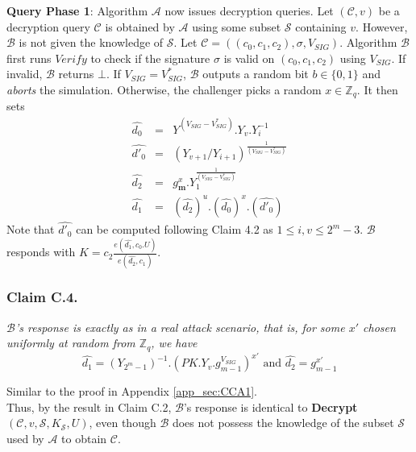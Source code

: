 \noindent\textbf{Query Phase 1}: Algorithm $\mathcal{A}$ now issues decryption queries. Let $(\mathcal{C},v)$ be a decryption query $\mathcal{C}$ is obtained by $\mathcal{A}$ using some subset $\mathcal{S}$ containing $v$. However, $\mathcal{B}$ is not given the knowledge of $\mathcal{S}$. Let $\mathcal{C}=((c_0,c_1,c_2),\sigma,V_{SIG})$. Algorithm $\mathcal{B}$ first runs $Verify$ to check if the signature $\sigma$ is valid on $(c_0,c_1,c_2)$ using $V_{SIG}$. If invalid, $\mathcal{B}$ returns $\bot$. If $V_{SIG} = V^{*}_{SIG}$, $\mathcal{B}$ outputs a random bit $b\in\{0,1\}$ and \emph{aborts} the simulation. Otherwise, the challenger picks a random $x\in\mathbb{Z}_q$. It then sets
\begin{eqnarray}
 \hat{d_0}&=&Y^{(V_{SIG}-V^{*}_{SIG})}.Y_v.Y^{-1}_i\nonumber\\
 \hat{d'_0}&=&(Y_{v+1}/Y_{i+1})^{\frac{1}{(V_{SIG}-V^{*}_{SIG})}}\nonumber \\
 \hat{d_2}&=&g^{x}_{\mathbf{m}}.Y^{\frac{1}{(V_{SIG}-V^{*}_{SIG})}}_1\nonumber\\
 \hat{d_1}&=&\left(\hat{d_2}\right)^u.\left(\hat{d_0}\right)^x.\left(\hat{d'_0}\right) \nonumber 
\end{eqnarray}
\noindent Note that $\hat{d'_0}$ can be computed following Claim 4.2 as $1\leq i,v \leq 2^m-3$. $\mathcal{B}$ responds with $K=c_2\frac{{e}(\hat{d_1},c_0.U)}{{e}(\hat{d_2},c_1)}$. 

\subsubsection{Claim C.4.} \textit{$\mathcal{B}$'s response is exactly as in a real attack scenario, that is, for some $x'$ chosen uniformly at random from $\mathbb{Z}_q$, we have} 
\begin{equation}
\hat{d_1} = \left({Y_{2^m-1}}\right)^{-1}.\left(PK.Y_v.g^{V_{SIG}}_{m-1}\right)^{x'}  \text{ and }  \hat{d_2} = g^{x'}_{m-1}\nonumber
\end{equation}

 Similar to the proof in Appendix \ref{app_sec:CCA1}.\\

% 
% 

\noindent Thus, by the result in Claim C.2, $\mathcal{B}$'s response is identical to \textbf{Decrypt}$(\mathcal{C},v,\mathcal{S},K_{\mathcal{S}},U)$, even though $\mathcal{B}$ does not possess the knowledge of the subset $\mathcal{S}$ used by $\mathcal{A}$ to obtain $\mathcal{C}$.\\
 
